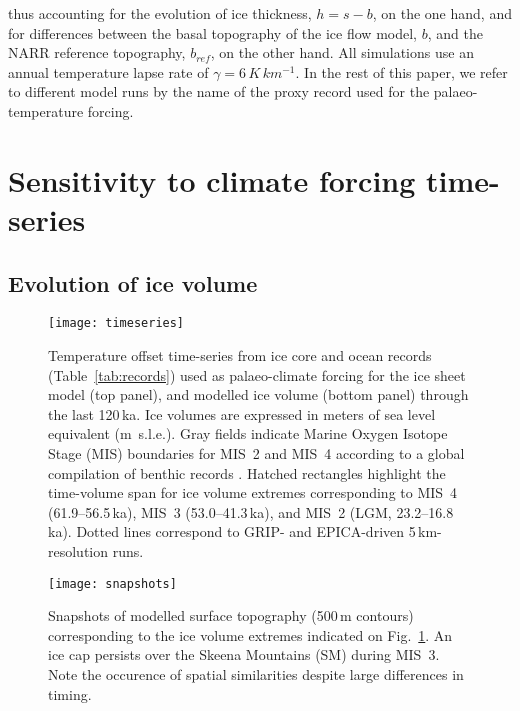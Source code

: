 \documentclass[tc]{copernicus}
\begin{document}
thus accounting for the evolution of ice thickness, ${h=s-b}$,
on the one hand, and for differences between the basal topography of the ice
flow model, $b$, and the
NARR reference topography, $b_{ref}$, on the other hand. All simulations use an
annual temperature lapse rate of $\gamma = 6\,\unit{K\,km^{-1}}$.
In the rest of this paper, we refer to different model runs by the name of the
proxy record used for the palaeo-temperature forcing.

\section{Sensitivity to climate forcing time-series}
\label{sec:results}

\subsection{Evolution of ice volume}

\begin{figure*}
  \texttt{[image: timeseries]}
  \caption{Temperature offset time-series from ice core and ocean records
           (Table~\ref{tab:records}) used as palaeo-climate forcing for the ice
           sheet model (top panel), and modelled ice volume (bottom panel)
           through the last 120\,ka. Ice volumes are expressed in meters of sea
           level equivalent (m~s.l.e.). Gray fields indicate Marine Oxygen
           Isotope Stage (MIS) boundaries for MIS~2 and MIS~4 according to a
           global compilation of benthic  records
           \citep{Lisiecki.Raymo.2005}. Hatched rectangles highlight the
           time-volume span for ice volume extremes corresponding to MIS~4
           (61.9--56.5\,ka), MIS~3 (53.0--41.3\,ka), and MIS~2 (LGM,
           23.2--16.8\,ka). Dotted lines correspond to GRIP- and EPICA-driven
           5\,km-resolution runs.}
  \label{fig:timeseries}
\end{figure*}

\begin{figure*}
  \texttt{[image: snapshots]}
  \caption{Snapshots of modelled surface topography (500\,m contours)
           corresponding to the ice volume extremes indicated on
           Fig.~\ref{fig:timeseries}. An ice cap persists over the Skeena
           Mountains (SM) during MIS~3. Note the occurence of spatial
           similarities despite large differences in timing.}
  \label{fig:snapshots}
\end{figure*}
\end{document}
